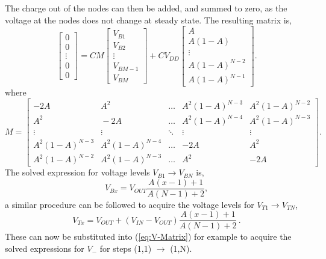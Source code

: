 \documentclass[conference]{article}
\begin{document}
	The charge out of the nodes can then be added, and summed to zero, as the voltage at the nodes does not change at steady state. The resulting matrix is,
	\begin{equation}
	\begin{bmatrix}
	0 \\
	0 \\
	\vdots\\
	0 \\ 
	0
	\end{bmatrix} =
	CM\begin{bmatrix}
	V_{B1} \\
	V_{B2} \\
	\vdots \\
	V_{BM-1} \\
	V_{BM}
	\end{bmatrix} + \!CV_{DD}\begin{bmatrix}
	A \\
	A(1-A) \\
	\vdots \\
	A(1-A)^{N-2} \\
	A(1-A)^{N-1}
	\end{bmatrix}.
	\end{equation}
	where 
	\begin{equation}
	M=\begin{bmatrix}
	-2A \!& A^2 & \dots & A^2(1\!-\!A)^{N-3} & A^2(1\!-\!A)^{N-2} \\
	A^2 \!& \!-2A & \dots & A^2(1\!-\!A)^{N-4} & A^2(1\!-\!A)^{N-3}\\
	\vdots & \vdots & \ddots & \vdots & \vdots \\
	A^2(1\!-\!A)^{N-3} \!& A^2(1\!-\!A)^{N-4} \!& \dots & -2A & A^2\\ 
	A^2(1\!-\!A)^{N-2} \!& A^2(1\!-\!A)^{N-3} \!& \dots & A^2 & -2A
	\end{bmatrix}.
	\end{equation}
	The solved expression for voltage levels $V_{B1} \rightarrow V_{BN}$ is,
	\begin{equation}
	V_{Bx} = V_{OUT}\frac{A(x-1) + 1}{A(N-1) + 2},
	\end{equation}
	a similar procedure can be followed to acquire the voltage levels for $V_{T1} \rightarrow V_{TN}$,
	\begin{equation}
	V_{Tx} = V_{OUT} + (V_{IN} - V_{OUT})\frac{A(x-1) + 1}{A(N-1) + 2}\,.
	\end{equation}
	These can now be substituted into (\ref{eq:V-Matrix}) for example to acquire the solved expressions for $V_-$ for steps (1,1) $\rightarrow$ (1,N).
\end{document}
